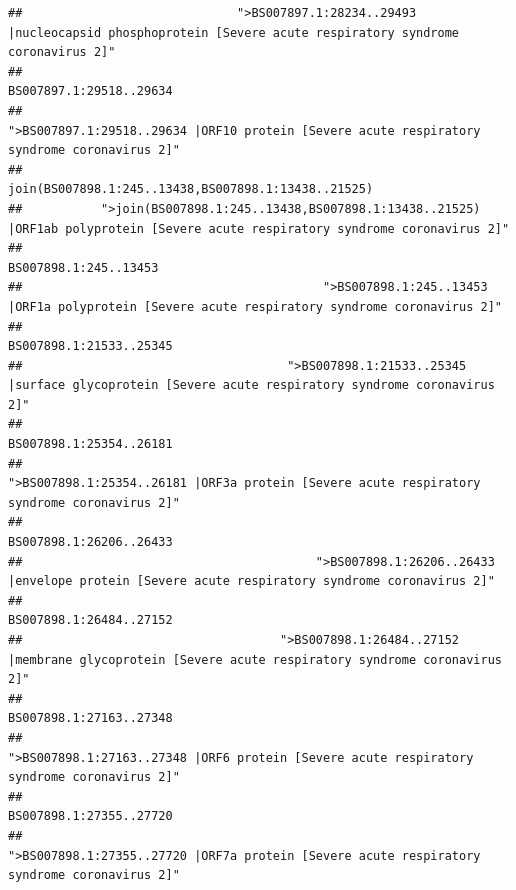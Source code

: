 \documentclass[
]{article}
\begin{document}
\begin{verbatim}
##                              ">BS007897.1:28234..29493 |nucleocapsid phosphoprotein [Severe acute respiratory syndrome coronavirus 2]" 
##                                                                                                                BS007897.1:29518..29634 
##                                            ">BS007897.1:29518..29634 |ORF10 protein [Severe acute respiratory syndrome coronavirus 2]" 
##                                                                                    join(BS007898.1:245..13438,BS007898.1:13438..21525) 
##           ">join(BS007898.1:245..13438,BS007898.1:13438..21525) |ORF1ab polyprotein [Severe acute respiratory syndrome coronavirus 2]" 
##                                                                                                                  BS007898.1:245..13453 
##                                          ">BS007898.1:245..13453 |ORF1a polyprotein [Severe acute respiratory syndrome coronavirus 2]" 
##                                                                                                                BS007898.1:21533..25345 
##                                     ">BS007898.1:21533..25345 |surface glycoprotein [Severe acute respiratory syndrome coronavirus 2]" 
##                                                                                                                BS007898.1:25354..26181 
##                                            ">BS007898.1:25354..26181 |ORF3a protein [Severe acute respiratory syndrome coronavirus 2]" 
##                                                                                                                BS007898.1:26206..26433 
##                                         ">BS007898.1:26206..26433 |envelope protein [Severe acute respiratory syndrome coronavirus 2]" 
##                                                                                                                BS007898.1:26484..27152 
##                                    ">BS007898.1:26484..27152 |membrane glycoprotein [Severe acute respiratory syndrome coronavirus 2]" 
##                                                                                                                BS007898.1:27163..27348 
##                                             ">BS007898.1:27163..27348 |ORF6 protein [Severe acute respiratory syndrome coronavirus 2]" 
##                                                                                                                BS007898.1:27355..27720 
##                                            ">BS007898.1:27355..27720 |ORF7a protein [Severe acute respiratory syndrome coronavirus 2]" 

\end{verbatim}
\end{document}
